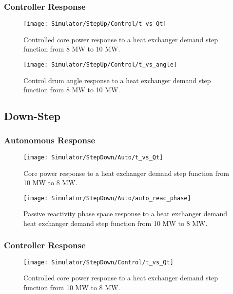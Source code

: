 \subsubsection{Controller Response}
\begin{figure}[ht!]
    \centering
    \texttt{[image: Simulator/StepUp/Control/t\_vs\_Qt]}
    \caption[Controlled Up-Step Power Response ]{Controlled core power response to a heat exchanger demand step function from 8 MW to 10 MW.}
    \label{fig:Up-Power-Ctr}
\end{figure}

\begin{figure}[ht!]
    \centering
    \texttt{[image: Simulator/StepUp/Control/t\_vs\_angle]}
    \caption[Up-Step Actuator Response]{Control drum angle response to a heat exchanger demand step function from 8 MW to 10 MW.}
    \label{fig:Up-Drum}
\end{figure}
\clearpage

\subsection{Down-Step}

\subsubsection{Autonomous Response}
\begin{figure}[ht!]
    \centering
    \texttt{[image: Simulator/StepDown/Auto/t\_vs\_Qt]}
    \caption[Autonomous Down-Step Power Response]{Core power response to a heat exchanger demand step function from 10 MW to 8 MW.}
    \label{fig:Down-Power-Auto}
\end{figure}

\begin{figure}[ht!]
    \centering
    \texttt{[image: Simulator/StepDown/Auto/auto\_reac\_phase]}
    \caption[Autonomous Down-Step Reactivity Phase Space]{Passive reactivity phase space response to a heat exchanger demand heat exchanger demand step function from 10 MW to 8 MW.}
    \label{fig:Down-PassivePhase-Auto}
\end{figure}
\clearpage

\subsubsection{Controller Response}
\begin{figure}[ht!]
    \centering
    \texttt{[image: Simulator/StepDown/Control/t\_vs\_Qt]}
    \caption[Controlled Down-Step Power Response ]{Controlled core power response to a heat exchanger demand step function from 10 MW to 8 MW.}
    \label{fig:Down-Power-Ctr}
\end{figure}

